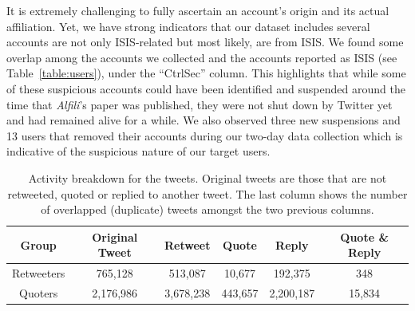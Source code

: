 \documentclass[letterpaper]{article} %
\begin{document}
It is extremely challenging to fully ascertain an account's origin and its actual affiliation.
Yet, we have strong indicators that our dataset includes several  accounts are not only ISIS-related but most likely, are from ISIS. We found some overlap among the accounts we collected and the accounts reported as ISIS (see Table~\ref{table:users}), under the ``CtrlSec'' column. This highlights that while some of these suspicious accounts could have been identified and suspended around the time that \textit{Alfili}'s paper was published, they were not shut down by Twitter yet and had remained alive for a while. We also observed three new suspensions and 13 users that removed their accounts during our two-day data collection which is indicative of  the suspicious nature of our target users.




\begin{table}[!htbp]
\centering
\begin{tabular}{|c||c|c|c|c|c|}
 \hline
 Group & Original Tweet & Retweet & Quote & Reply & Quote \& Reply \\ [0.5ex]
 \hline\hline
  \rule{0pt}{1ex} Retweeters & 765,128 & 513,087 & 10,677 & 192,375 & 348\\\hline
 Quoters & 2,176,986 & 3,678,238 & 443,657 & 2,200,187 & 15,834\\[0.25ex]\hline
\end{tabular}
\caption{Activity breakdown for the tweets. Original tweets are those that are not retweeted, quoted or replied to another tweet. The last column shows the number of overlapped (duplicate) tweets amongst the two previous columns.}
\label{table:activity-type}
\end{table}
\end{document}
